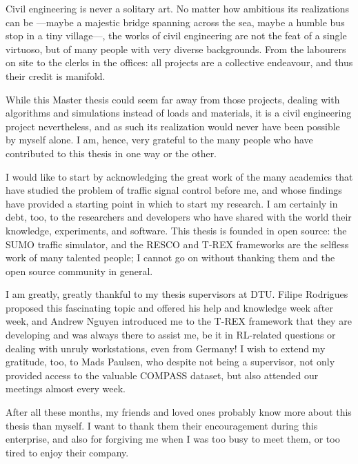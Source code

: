 

\vspace{1cm}

\noindent Civil engineering is never a solitary art. No matter how ambitious its
realizations can be —maybe a majestic bridge spanning across the sea, maybe a
humble bus stop in a tiny village—, the works of civil engineering are not the 
feat of a single virtuoso, but of many people with very diverse backgrounds.
From the labourers on site to the clerks in the offices: all projects are a collective endeavour, and thus their credit is manifold.

While this Master thesis could seem far away from those projects, dealing with algorithms and simulations instead of loads and materials, it is a civil engineering project nevertheless, and as such its realization would never have been possible by myself alone. I am, hence, very grateful to the many people who have contributed to this thesis in one way or the other.

I would like to start by acknowledging the great work of the many academics that have studied the problem of traffic signal control before me, and whose findings have provided a starting point in which to start my research. I am certainly in debt, too, to the researchers and developers who have shared with the world their knowledge, experiments, and software. This thesis is founded in 
open source: the SUMO traffic simulator, and the RESCO and T-REX frameworks are the selfless work of many talented people; I cannot go on without thanking them and the open source community in general.

I am greatly, greatly thankful to my thesis supervisors at DTU. Filipe Rodrigues proposed this fascinating topic and offered his help and knowledge week after week, and Andrew Nguyen introduced me to the T-REX framework that they are developing and was always there to assist me, be it in RL-related questions or dealing with unruly workstations, even from Germany! I wish to extend my gratitude, too, to Mads Paulsen, who despite not being a supervisor, not only provided access to the valuable COMPASS dataset, but also attended our meetings almost every week.

After all these months, my friends and loved ones probably know more about this thesis than myself. I want to thank them their encouragement during this enterprise, and also for forgiving me when I was too busy to meet them, or too tired to enjoy their company. 


